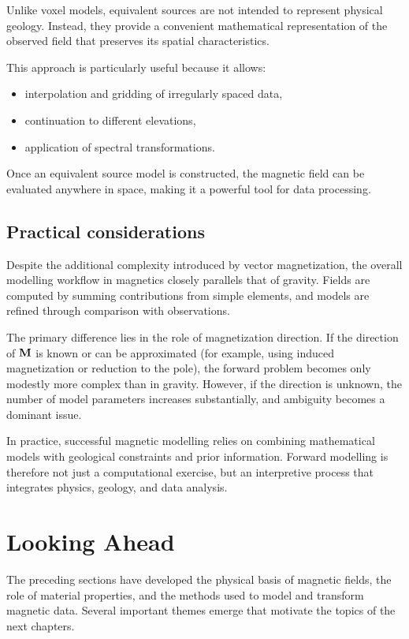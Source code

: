 Unlike voxel models, equivalent sources are not intended to represent physical geology. Instead, they provide a convenient mathematical representation of the observed field that preserves its spatial characteristics.

This approach is particularly useful because it allows:
\begin{itemize}
    \item interpolation and gridding of irregularly spaced data,
    \item continuation to different elevations,
    \item application of spectral transformations.
\end{itemize}

Once an equivalent source model is constructed, the magnetic field can be evaluated anywhere in space, making it a powerful tool for data processing.

\subsection{Practical considerations}

Despite the additional complexity introduced by vector magnetization, the overall modelling workflow in magnetics closely parallels that of gravity. Fields are computed by summing contributions from simple elements, and models are refined through comparison with observations.

The primary difference lies in the role of magnetization direction. If the direction of $\vb{M}$ is known or can be approximated (for example, using induced magnetization or reduction to the pole), the forward problem becomes only modestly more complex than in gravity. However, if the direction is unknown, the number of model parameters increases substantially, and ambiguity becomes a dominant issue.

In practice, successful magnetic modelling relies on combining mathematical models with geological constraints and prior information. Forward modelling is therefore not just a computational exercise, but an interpretive process that integrates physics, geology, and data analysis.

\section{Looking Ahead}

The preceding sections have developed the physical basis of magnetic fields, the role of material properties, and the methods used to model and transform magnetic data. Several important themes emerge that motivate the topics of the next chapters.

